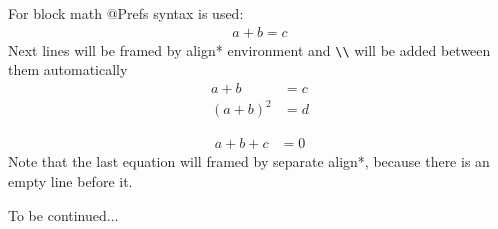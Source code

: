 \documentclass[12pt,a4paper,oneside]{article}
\begin{document}
For block math @Prefs syntax is used: 
\begin{align*}
a + b = c 
\end{align*}
Next lines will be framed by align* environment and \verb.\\. 
will be added between them automatically
\begin{align*}
a + b     &= c
\\(a + b)^2 &= d
\end{align*}

\begin{align*}
a + b + c &= 0
\end{align*}
Note that the last equation will framed by separate align*, because
there is an empty line before it. 

To be continued... 
\end{document}
